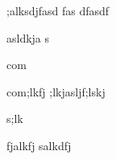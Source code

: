 ;alksdjfasd
fas
dfasdf

\begin{comment}
;skjdf
\end{comment}

asldkja s

com

com;lkfj ;lkjasljf;lskj

s;lk

fjalkfj
salkdfj 
